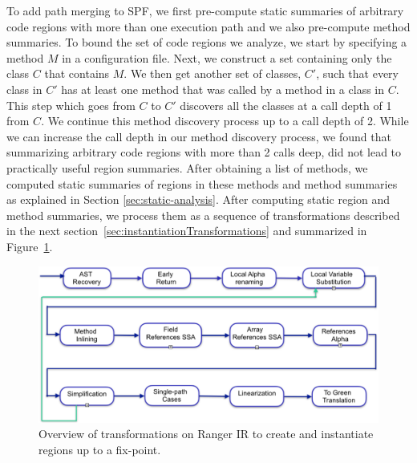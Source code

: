 %
To add path merging to SPF, we first pre-compute static summaries of arbitrary code regions with more than one execution
path and we also pre-compute method summaries.
%
To bound the set of code regions we analyze, we start by specifying a method $M$ in a configuration file.
%
Next, we construct a set containing only the class $C$ that contains $M$.
%
We then get another set of classes, $C'$,
such that every class in $C'$ has at least one method that was called by a method in a class in $C$.
%
This step which goes from $C$ to $C'$ discovers all the classes at a call depth of 1 from $C$.
%
We continue this method discovery process up to a call depth of 2.
%
While we can increase the call depth in our method discovery process, we found that summarizing
arbitrary code regions with more than 2 calls deep, did not lead to practically useful region summaries.
%
After obtaining a list of methods, we computed static summaries of regions in these methods and method summaries as
explained in Section \ref{sec:static-analysis}.
%
After computing static region and method summaries, we process them as a sequence of transformations described in the next section~\ref{sec:instantiationTransformations} and summarized
in Figure~\ref{fig:overview}.
%
\begin{figure}[]
    \caption{Overview of transformations on Ranger IR to create and instantiate regions up to a fix-point.}
    \label{fig:overview}
    \includegraphics[width=1.5\columnwidth]{figures/transformations.pdf}
\end{figure}
%
%

